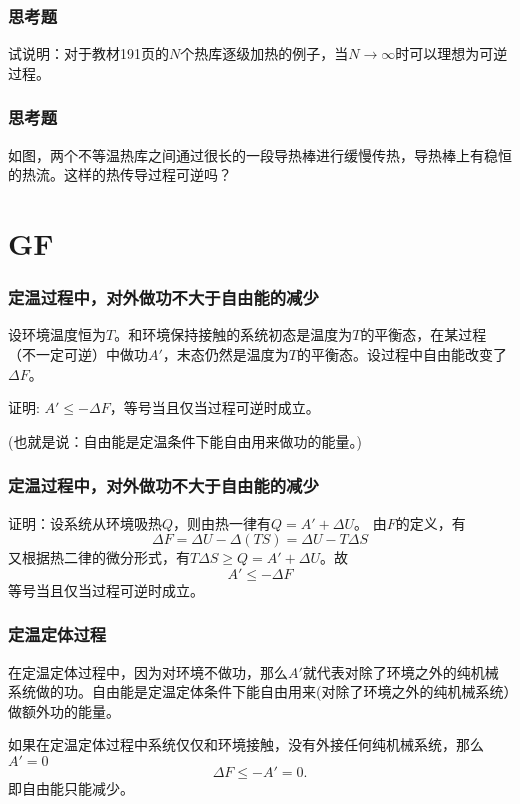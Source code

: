 \documentclass[CJK,14pt]{beamer}
\begin{document}
\begin{frame}
  \frametitle{思考题}


试说明：对于教材191页的$N$个热库逐级加热的例子，当$N\rightarrow \infty$时可以理想为可逆过程。

\end{frame}


\begin{frame}
  \frametitle{思考题}


如图，两个不等温热库之间通过很长的一段导热棒进行缓慢传热，导热棒上有稳恒的热流。这样的热传导过程可逆吗？

\end{frame}


\section{GF}


\begin{frame}
  \frametitle{定温过程中，对外做功不大于自由能的减少}

  设环境温度恒为$T$。和环境保持接触的系统初态是温度为$T$的平衡态，在某过程（不一定可逆）中做功$A'$，末态仍然是温度为$T$的平衡态。设过程中自由能改变了$\Delta F$。


  证明: $A'\le -\Delta F$，等号当且仅当过程可逆时成立。

  (也就是说：{\blue 自由能是定温条件下能自由用来做功的能量。})

\end{frame}


\begin{frame}
  \frametitle{定温过程中，对外做功不大于自由能的减少}
证明：设系统从环境吸热$Q$，则由热一律有$Q = A' + \Delta U$。
由$F$的定义，有
$$\Delta F = \Delta U - \Delta (TS) = \Delta U - T\Delta S $$
又根据热二律的微分形式，有$T\Delta S \ge Q = A' +\Delta U$。故
$$A' \le - \Delta F$$
等号当且仅当过程可逆时成立。
\end{frame}


\begin{frame}
\frametitle{定温定体过程}

在定温定体过程中，因为对环境不做功，那么$A'$就代表对除了环境之外的纯机械系统做的功。{\blue 自由能是定温定体条件下能自由用来(对除了环境之外的纯机械系统）做额外功的能量。}

  \skipline

  如果在定温定体过程中系统仅仅和环境接触，没有外接任何纯机械系统，那么$A'=0$
  $$\Delta F \le - A' = 0. $$
  即自由能只能减少。

\end{frame}
\end{document}
